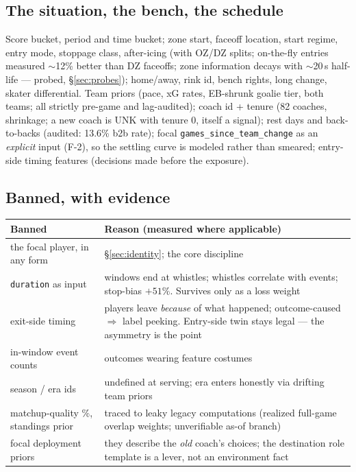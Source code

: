 \documentclass[11pt]{article}
\begin{document}
\subsection{The situation, the bench, the schedule}
Score bucket, period and time bucket; zone start, faceoff location, start
regime, entry mode, stoppage class, after-icing (with OZ/DZ splits; on-the-fly
entries measured $\sim$12\% better than DZ faceoffs; zone information decays
with $\sim$20\,s half-life --- probed, \S\ref{sec:probes}); home/away, rink id,
bench rights, long change, skater differential. Team priors (pace, xG rates,
EB-shrunk goalie tier, both teams; all strictly pre-game and lag-audited);
coach id + tenure (82 coaches, shrinkage; a new coach is UNK with tenure 0,
itself a signal); rest days and back-to-backs (audited: 13.6\% b2b rate);
focal \texttt{games\_since\_team\_change} as an \emph{explicit} input (F-2), so
the settling curve is modeled rather than smeared; entry-side timing features
(decisions made before the exposure).

\subsection{Banned, with evidence}
\begin{center}
\begin{tabular}{@{}p{}p{}@{}}
\toprule
\textbf{Banned} & \textbf{Reason (measured where applicable)} \\
\midrule
the focal player, in any form & \S\ref{sec:identity}; the core discipline \\
\texttt{duration} as input & windows end at whistles; whistles correlate with
events; stop-bias $+51\%$. Survives only as a loss weight \\
exit-side timing & players leave \emph{because} of what happened;
outcome-caused $\Rightarrow$ label peeking. Entry-side twin stays legal ---
the asymmetry is the point \\
in-window event counts & outcomes wearing feature costumes \\
season / era ids & undefined at serving; era enters honestly via drifting team
priors \\
matchup-quality \%, standings prior & traced to leaky legacy computations
(realized full-game overlap weights; unverifiable as-of branch) \\
focal deployment priors & they describe the \emph{old} coach's choices; the
destination role template is a lever, not an environment fact \\
\bottomrule
\end{tabular}
\end{center}
\end{document}
